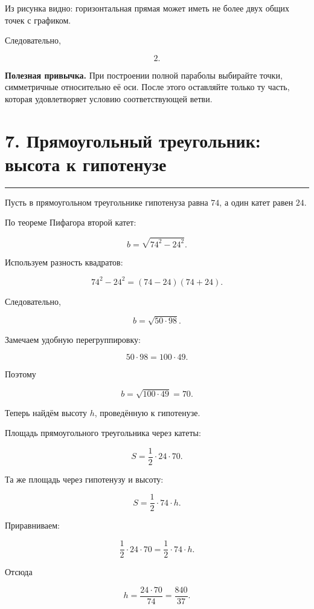 \documentclass[a4paper,12pt]{article}
\newcommand{\topicline}{
    \textcolor{accent}{\rule{\linewidth}{0.6pt}}
}
\begin{document}
Из рисунка видно:
горизонтальная прямая может иметь
не более двух общих точек с графиком.

Следовательно,

\[
\boxed{2}.
\]

\textbf{Полезная привычка.}
При построении полной параболы выбирайте точки,
симметричные относительно её оси.
После этого оставляйте только ту часть,
которая удовлетворяет условию соответствующей ветви.


\section*{7. Прямоугольный треугольник: высота к гипотенузе}
\topicline

Пусть в прямоугольном треугольнике
гипотенуза равна $74$,
а один катет равен $24$.

По теореме Пифагора второй катет:

\[
b=
\sqrt{74^2-24^2}.
\]

Используем разность квадратов:

\[
74^2-24^2
=
(74-24)(74+24).
\]

Следовательно,

\[
b=
\sqrt{50\cdot98}.
\]

Замечаем удобную перегруппировку:

\[
50\cdot98
=
100\cdot49.
\]

Поэтому

\[
b=
\sqrt{100\cdot49}
=
70.
\]

Теперь найдём высоту $h$,
проведённую к гипотенузе.

Площадь прямоугольного треугольника
через катеты:

\[
S=
\frac12\cdot24\cdot70.
\]

Та же площадь через гипотенузу и высоту:

\[
S=
\frac12\cdot74\cdot h.
\]

Приравниваем:

\[
\frac12\cdot24\cdot70
=
\frac12\cdot74\cdot h.
\]

Отсюда

\[
h=
\frac{24\cdot70}{74}
=
\boxed{\frac{840}{37}}.
\]
\end{document}
